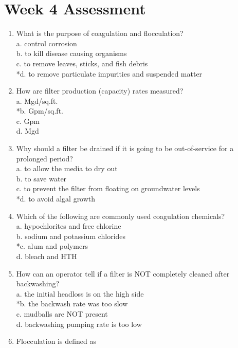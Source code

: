 \newpage
\section{Week 4 Assessment}
\begin{enumerate}[1.]

\item What is the purpose of coagulation and flocculation?\\
a. control corrosion\\
b. to kill disease causing organisms\\
c. to remove leaves, sticks, and fish debris\\
*d. to remove particulate impurities and suspended matter\\
\item How are filter production (capacity) rates measured?\\
a. Mgd/sq.ft.\\
*b. Gpm/sq.ft.\\
c. Gpm\\
d. Mgd\\
\item Why should a filter be drained if it is going to be out-of-service for a prolonged period?\\
a. to allow the media to dry out\\
b. to save water\\
c. to prevent the filter from floating on groundwater levels\\
*d. to avoid algal growth\\
\item Which of the following are commonly used coagulation chemicals?\\
a. hypochlorites and free chlorine\\
b. sodium and potassium chlorides\\
*c. alum and polymers\\
d. bleach and HTH\\
\item How can an operator tell if a filter is NOT completely cleaned after backwashing?\\
a. the initial headloss is on the high side\\
*b. the backwash rate was too slow\\
c. mudballs are NOT present\\
d. backwashing pumping rate is too low\\
\item Flocculation is defined as\\

\end{enumerate}
